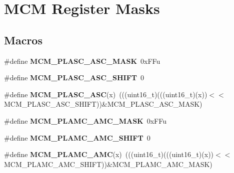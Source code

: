 \hypertarget{group__MCM__Register__Masks}{}\section{M\+CM Register Masks}
\label{group__MCM__Register__Masks}
\subsection*{Macros}
\begin{DoxyCompactItemize}
\item 
\#define {\bfseries M\+C\+M\+\_\+\+P\+L\+A\+S\+C\+\_\+\+A\+S\+C\+\_\+\+M\+A\+SK}~0x\+F\+Fu\hypertarget{group__MCM__Register__Masks_ga215cf860c41174735020a34e7ccf9590}{}\label{group__MCM__Register__Masks_ga215cf860c41174735020a34e7ccf9590}

\item 
\#define {\bfseries M\+C\+M\+\_\+\+P\+L\+A\+S\+C\+\_\+\+A\+S\+C\+\_\+\+S\+H\+I\+FT}~0\hypertarget{group__MCM__Register__Masks_ga88f833168fd51e1b3c950e21b00bbfc3}{}\label{group__MCM__Register__Masks_ga88f833168fd51e1b3c950e21b00bbfc3}

\item 
\#define {\bfseries M\+C\+M\+\_\+\+P\+L\+A\+S\+C\+\_\+\+A\+SC}(x)~(((uint16\+\_\+t)(((uint16\+\_\+t)(x))$<$$<$M\+C\+M\+\_\+\+P\+L\+A\+S\+C\+\_\+\+A\+S\+C\+\_\+\+S\+H\+I\+FT))\&M\+C\+M\+\_\+\+P\+L\+A\+S\+C\+\_\+\+A\+S\+C\+\_\+\+M\+A\+SK)\hypertarget{group__MCM__Register__Masks_gaaae648a9e1b6e2e44af89bb3a6881a54}{}\label{group__MCM__Register__Masks_gaaae648a9e1b6e2e44af89bb3a6881a54}

\item 
\#define {\bfseries M\+C\+M\+\_\+\+P\+L\+A\+M\+C\+\_\+\+A\+M\+C\+\_\+\+M\+A\+SK}~0x\+F\+Fu\hypertarget{group__MCM__Register__Masks_ga7988227df54012705c7f522f348214ee}{}\label{group__MCM__Register__Masks_ga7988227df54012705c7f522f348214ee}

\item 
\#define {\bfseries M\+C\+M\+\_\+\+P\+L\+A\+M\+C\+\_\+\+A\+M\+C\+\_\+\+S\+H\+I\+FT}~0\hypertarget{group__MCM__Register__Masks_gaa1b3153d0bf749f80fffacd948dd4bd4}{}\label{group__MCM__Register__Masks_gaa1b3153d0bf749f80fffacd948dd4bd4}

\item 
\#define {\bfseries M\+C\+M\+\_\+\+P\+L\+A\+M\+C\+\_\+\+A\+MC}(x)~(((uint16\+\_\+t)(((uint16\+\_\+t)(x))$<$$<$M\+C\+M\+\_\+\+P\+L\+A\+M\+C\+\_\+\+A\+M\+C\+\_\+\+S\+H\+I\+FT))\&M\+C\+M\+\_\+\+P\+L\+A\+M\+C\+\_\+\+A\+M\+C\+\_\+\+M\+A\+SK)\hypertarget{group__MCM__Register__Masks_gad8199ccd7b6edb29bcd5e940d17e7e47}{}\label{group__MCM__Register__Masks_gad8199ccd7b6edb29bcd5e940d17e7e47}


\end{DoxyCompactItemize}
